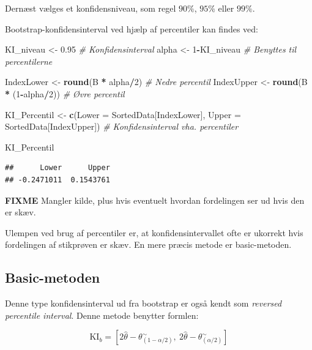 \documentclass[
]{book}
\newenvironment{Shaded}{\begin{snugshade}}{\end{snugshade}}
\newcommand{\CommentTok}[1]{\textcolor[rgb]{0.56,0.35,0.01}{\textit{#1}}}
\newcommand{\DataTypeTok}[1]{\textcolor[rgb]{0.13,0.29,0.53}{#1}}
\newcommand{\DecValTok}[1]{\textcolor[rgb]{0.00,0.00,0.81}{#1}}
\newcommand{\FloatTok}[1]{\textcolor[rgb]{0.00,0.00,0.81}{#1}}
\newcommand{\KeywordTok}[1]{\textcolor[rgb]{0.13,0.29,0.53}{\textbf{#1}}}
\newcommand{\NormalTok}[1]{#1}
\newcommand{\OperatorTok}[1]{\textcolor[rgb]{0.81,0.36,0.00}{\textbf{#1}}}
\newcommand{\StringTok}[1]{\textcolor[rgb]{0.31,0.60,0.02}{#1}}
\theoremstyle{definition}
\theoremstyle{definition}
\theoremstyle{definition}
\theoremstyle{remark}
\begin{document}
Dernæst vælges et konfidensniveau, som regel \(90\%\), \(95\%\) eller \(99\%\).

Bootstrap-konfidensinterval ved hjælp af percentiler kan findes ved:

\begin{Shaded}
\begin{Highlighting}[]
\NormalTok{KI_niveau <-}\StringTok{ }\FloatTok{0.95} \CommentTok{# Konfidensinterval}
\NormalTok{alpha <-}\StringTok{ }\DecValTok{1}\OperatorTok{-}\NormalTok{KI_niveau }\CommentTok{# Benyttes til percentilerne}

\NormalTok{IndexLower <-}\StringTok{ }\KeywordTok{round}\NormalTok{(B }\OperatorTok{*}\StringTok{ }\NormalTok{alpha}\OperatorTok{/}\DecValTok{2}\NormalTok{) }\CommentTok{# Nedre percentil}
\NormalTok{IndexUpper <-}\StringTok{ }\KeywordTok{round}\NormalTok{(B }\OperatorTok{*}\StringTok{ }\NormalTok{(}\DecValTok{1}\OperatorTok{-}\NormalTok{alpha}\OperatorTok{/}\DecValTok{2}\NormalTok{)) }\CommentTok{# Øvre percentil}

\NormalTok{KI_Percentil <-}\StringTok{ }\KeywordTok{c}\NormalTok{(}\DataTypeTok{Lower =}\NormalTok{ SortedData[IndexLower], }\DataTypeTok{Upper =}\NormalTok{ SortedData[IndexUpper])}
  \CommentTok{# Konfidensinterval vha. percentiler}

\NormalTok{KI_Percentil}
\end{Highlighting}
\end{Shaded}

\begin{verbatim}
##      Lower      Upper
## -0.2471011  0.1543761
\end{verbatim}

\textbf{FIXME} Mangler kilde, plus hvis eventuelt hvordan fordelingen ser ud hvis den er skæv.

Ulempen ved brug af percentiler er, at konfidensintervallet ofte er ukorrekt hvis fordelingen af stikprøven er skæv. En mere præcis metode er basic-metoden.

\hypertarget{basic-metoden}{%
\subsection{Basic-metoden}\label{basic-metoden}}

Denne type konfidensinterval ud fra bootstrap er også kendt som \emph{reversed percentile interval}. Denne metode benytter formlen:

\[\text{KI}_b = \left[2\hat\theta- \theta^{{\sim}}_{(1-\alpha/2)}, ~ 2\hat\theta- \theta^{{\sim}}_{(\alpha/2)}\right]\]
\end{document}
